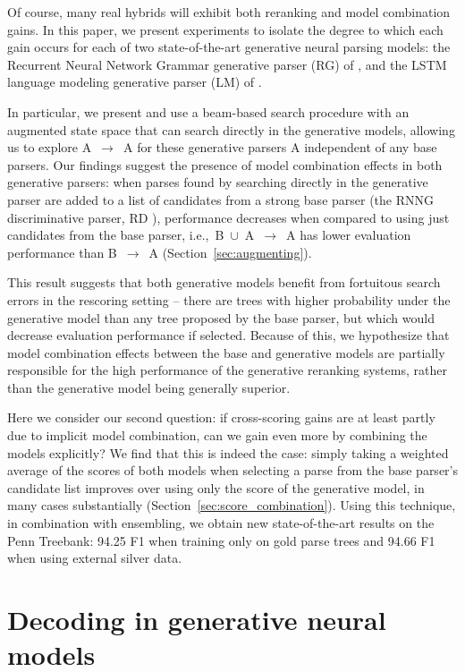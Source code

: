 \documentclass[11pt,a4paper]{article}
\newcommand{\p}{\ensuremath{\rightarrow}\xspace}
\newcommand{\un}{\ensuremath{\cup}\xspace}
\begin{document}
Of course, many real hybrids will exhibit both reranking and model combination gains. In this paper, we present experiments to isolate the degree to which each gain occurs for each of two state-of-the-art generative neural parsing models: the Recurrent Neural Network Grammar generative parser (RG) of \citet{dyer2016recurrent}, and the LSTM language modeling generative parser (LM) of \citet{Choe16Parsing}.

In particular, we present and use a beam-based search procedure with an augmented state space that can search directly in the generative models, allowing us to explore \mbox{A \p A} for these generative parsers A independent of any base parsers. Our findings suggest the presence of model combination effects in both generative parsers: when parses found by searching directly in the generative parser are added to a list of candidates from a strong base parser (the RNNG discriminative parser, RD \citep{dyer2016recurrent}), performance decreases when compared to using just candidates from the base parser, i.e.,\ \mbox{B \un A \p A} has lower evaluation performance than \mbox{B \p A} (Section~\ref{sec:augmenting}).

This result suggests that both generative models benefit from fortuitous search errors in the rescoring setting -- there are trees with higher probability under the generative model than any tree proposed by the base parser, but which would decrease evaluation performance if selected. Because of this, we hypothesize that model combination effects between the base and generative models are partially responsible for the high performance of the generative reranking systems, rather than the generative model being generally superior.

Here we consider our second question: if cross-scoring gains are at least partly due to implicit model combination, can we gain even more by combining the models explicitly?  We find that this is indeed the case: simply taking a weighted average of the scores of both models when selecting a parse from the base parser's candidate list improves over using only the score of the generative model, in many cases substantially (Section~\ref{sec:score_combination}). Using this technique, in combination with ensembling, we obtain new state-of-the-art results on the Penn Treebank: 94.25 F1 when training only on gold parse trees and 94.66 F1 when using external silver data.

\section{Decoding in generative neural models}
\end{document}
